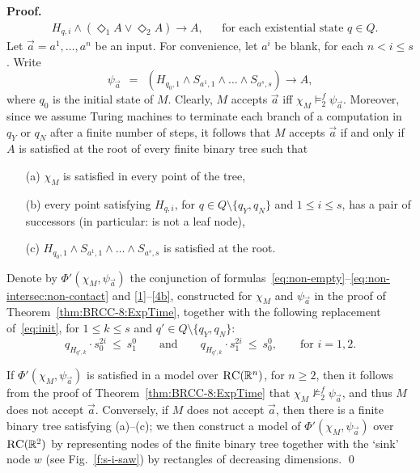 \documentclass{LMCS}
\renewenvironment{proof}{\par\noindent\textbf{Proof.}}{\mbox{}\qed\par\medskip}
\theoremstyle{plain}
\begin{document}
\begin{proof}
\begin{align*}
& H_{q,i} \land (\Diamond_1 A \lor \Diamond_2 A) \to A,&&\text{for each existential state }q\in Q.\end{align*}
Let $\vec{a} = a^1,\dots,a^n$ be an input. For convenience, let $a^i$ be blank, for each $n < i \leq s$. Write
\begin{equation*}
\psi_{\vec{a}} \ \ = \ \ (H_{q_0,1} \land S_{a^1,1} \land \dots \land S_{a^s,s}) \to A,
\end{equation*}
where $q_0$ is the initial state of $M$. Clearly, $M$ accepts
$\vec{a}$ iff $\chi_M\models_2^f\psi_{\vec{a}}$. Moreover,
since we assume
Turing machines to terminate each branch of a
computation in $q_Y$ or $q_N$ after a finite number of steps,
it follows that $M$
accepts $\vec{a}$ if and only if $A$ is satisfied at the root of every finite
binary tree such that
\begin{enumerate}[(b)]
\item[(a)] $\chi_M$ is satisfied in every point of the tree,
\item[(b)] every point satisfying $H_{q,i}$,
for $q\in Q\setminus\{q_Y,q_N\}$ and $1 \leq i \leq s$, has a pair of
successors (in particular: is not a leaf node),
\item[(c)] $H_{q_0,1} \land S_{a^1,1} \land \dots\land S_{a^s,s}$ is satisfied at the root.
\end{enumerate}
Denote by $\Phi'(\chi_M,\psi_{\vec{a}})$ the conjunction of formulas~\eqref{eq:non-empty}--\eqref{eq:non-intersec:non-contact} and \eqref{1}--\eqref{4b}, constructed for $\chi_M$ and $\psi_{\vec{a}}$ in the proof of Theorem~\ref{thm:BRCC-8:ExpTime}, together with
the following replacement of~\eqref{eq:init}, for $1 \leq k \leq s$ and $q'\in Q\setminus\{q_Y,q_N\}$:
\begin{equation}
\label{eq:init:prime}
q_{H_{q',k}} \cdot s_0^{2i} ~\le~ s_1^0\qquad\text{and}\qquad q_{H_{q',k}} \cdot s_1^{2i} ~\le~ s_0^0,\qquad \text{for } i=1,2.\end{equation}


If $\Phi'(\chi_M,\psi_{\vec{a}})$ is satisfied in a model over $\textsc{RC}(\mathbb{R}^n)$, for $n \geq 2$, then it follows from the proof of Theorem~\ref{thm:BRCC-8:ExpTime} that $\chi_M\not\models_2^f\psi_{\vec{a}}$, and thus $M$ does not accept $\vec{a}$. Conversely, if $M$ does not accept $\vec{a}$, then there is a finite binary tree satisfying (a)--(c); we then construct a model of $\Phi'(\chi_M,\psi_{\vec{a}})$ over $\textsc{RC}(\mathbb{R}^2)$ by representing nodes of the finite binary tree together with the `sink' node $w$ (see Fig.~\ref{f:s-i-saw}) by rectangles of decreasing dimensions.
\end{proof}
\end{document}
